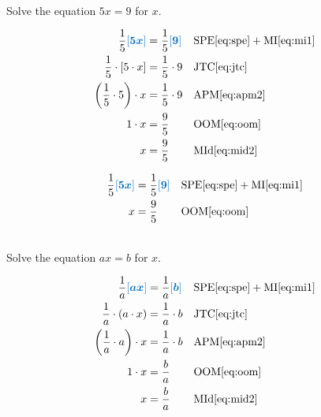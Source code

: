 \documentclass[20150903-160354-rs2.2-MarksMathNotebook.tex]{subfiles}
\begin{document}
\begin{example}[id:20141206-102404] \label{20141206-102404} \hfill \\

Solve the equation $5x=9$ for $x$.

\soln

\solnsteps
\begin{align*}
\dfrac{1}{5}\farg{5x} &= \dfrac{1}{5}\farg{9} && \text{SPE} \eqref{eq:spe} + \text{MI} \eqref{eq:mi1} \\
\dfrac{1}{5} \cdot \left[ 5 \cdot x \right] &= \dfrac{1}{5} \cdot 9 && \text{JTC} \eqref{eq:jtc} \\
\left(\dfrac{1}{5} \cdot 5 \right) \cdot x &= \dfrac{1}{5} \cdot 9  && \text{APM} \eqref{eq:apm2} \\
1\cdot x &= \dfrac{9}{5}  && \text{OOM} \eqref{eq:oom} \\
x &= \dfrac{9}{5}  && \text{MId} \eqref{eq:mid2}
\end{align*}

\soln

\lesssteps
\begin{align*}
\dfrac{1}{5}\farg{5x} &= \dfrac{1}{5}\farg{9} && \text{SPE} \eqref{eq:spe} + \text{MI} \eqref{eq:mi1} \\
x &= \dfrac{9}{5}  && \text{OOM} \eqref{eq:oom}
\end{align*}
\end{example}

\begin{example}[id:20141206-104404] \label{20141206-104404} \hfill \\

Solve the equation $ax=b$ for $x$.

\soln

\solnsteps
\begin{align*}
\dfrac{1}{a}\farg{ax} &= \dfrac{1}{a}\farg{b} && \text{SPE} \eqref{eq:spe} + \text{MI} \eqref{eq:mi1} \\
\dfrac{1}{a} \cdot \left( a \cdot x \right) &= \dfrac{1}{a} \cdot b && \text{JTC} \eqref{eq:jtc} \\
\left(\dfrac{1}{a} \cdot a \right) \cdot x &= \dfrac{1}{a} \cdot b  && \text{APM} \eqref{eq:apm2} \\
1\cdot x &= \dfrac{b}{a}  && \text{OOM} \eqref{eq:oom} \\
x &= \dfrac{b}{a}  && \text{MId} \eqref{eq:mid2}
\end{align*}
\end{example}
\end{document}
